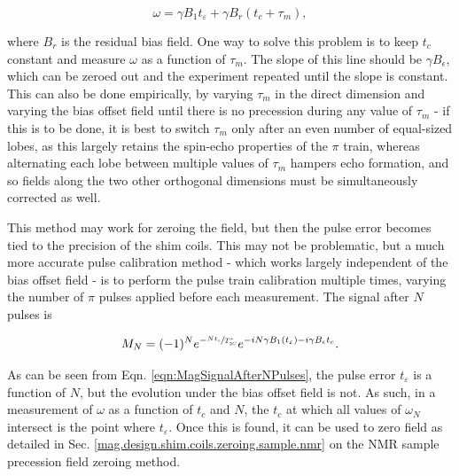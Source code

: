 \documentclass[PaulGanssle-Thesis.tex]{subfiles}
\begin{document}
\begin{equation}
\label{eqn:PulseCalSignalWithBias}
\omega = \gamma B_{1}t_{\varepsilon} + \gamma B_{r}\left(t_{c} + \tau_{m}\right),
\end{equation}

where $B_{r}$ is the residual bias field. One way to solve this problem is to keep $t_{c}$ constant and measure $\omega$ as a function of $\tau_{m}$. The slope of this line should be $\gamma B_\epsilon$, which can be zeroed out and the experiment repeated until the slope is constant. This can also be done empirically, by varying $\tau_m$ in the direct dimension and varying the bias offset field until there is no precession during any value of $\tau_{m}$ - if this is to be done, it is best to switch $\tau_{m}$ only after an even number of equal-sized lobes, as this largely retains the spin-echo properties of the $\pi$ train, whereas alternating each lobe between multiple values of $\tau_{m}$ hampers echo formation, and so fields along the two other orthogonal dimensions must be simultaneously corrected as well.

This method may work for zeroing the field, but then the pulse error becomes tied to the precision of the shim coils. This may not be problematic, but a much more accurate pulse calibration method - which works largely independent of the bias offset field - is to perform the pulse train calibration multiple times, varying the number of $\pi$ pulses applied before each measurement. The signal after $N$ pulses is

\begin{equation}
\label{eqn:MagSignalAfterNPulses}
M_{N} = (-1)^{N}e^{-\sfrac{Nt_{c}}{T_{2C}^*}}e^{-iN\gamma B_{1}(t_{\varepsilon}) - i\gamma B_{\epsilon}t_{c}}.
\end{equation}

As can be seen from Eqn. \ref{eqn:MagSignalAfterNPulses}, the pulse error $t_{\varepsilon}$ is a function of $N$, but the evolution under the bias offset field is not. As such, in a measurement of $\omega$ as a function of $t_{c}$ and $N$, the $t_{c}$ at which all values of $\omega_{N}$ intersect is the point where $t_{\varepsilon}$. Once this is found, it can be used to zero field as detailed in Sec. \ref{mag.design.shim.coils.zeroing.sample.nmr} on the NMR sample precession field zeroing method.
\end{document}
